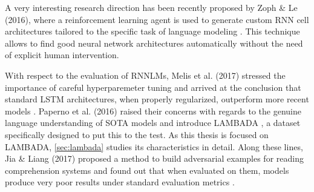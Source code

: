 A very interesting research direction has been recently proposed by Zoph \& Le (2016), where a reinforcement learning agent is used to generate custom
RNN cell architectures tailored to the specific task of language modeling \cite{zoph2016neural}. This technique allows to find good neural network architectures automatically without the need of explicit human intervention.

With respect to the evaluation of RNNLMs, Melis et al. (2017) stressed the importance of careful hyperparemeter tuning and arrived at the conclusion that standard LSTM architectures, when properly regularized, outperform more recent models \cite{melis2017state}. Paperno et al. (2016) raised their concerns with regards to the genuine language understanding of SOTA models and introduce LAMBADA \cite{paperno2016lambada}, a dataset specifically designed to put this to the test. As this thesis is focused on LAMBADA, \autoref{sec:lambada} studies its characteristics in detail. Along these lines, Jia \& Liang (2017) proposed a method to build adversarial examples for reading comprehension systems and found out that when evaluated on them, models produce very poor results under standard evaluation metrics \cite{jia2017adversarial}.